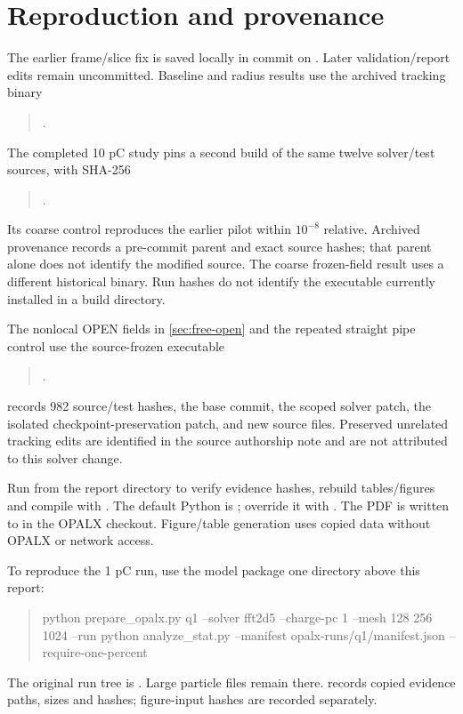 \clearpage
\section{Reproduction and provenance}
The earlier frame/slice fix is saved locally in commit  on
.
Later validation/report edits remain uncommitted. Baseline and radius results
use the archived tracking binary
\begin{quote}\small
{}.
\end{quote}
The completed 10 pC study pins a second build of the same twelve solver/test
sources, with SHA-256
\begin{quote}\small
{}.
\end{quote}
Its coarse control reproduces the earlier pilot within $10^{-8}$ relative.
Archived provenance records a pre-commit parent and exact source hashes; that
parent alone does not identify the modified source. The coarse frozen-field
result uses a different historical binary. Run hashes do not identify the
executable currently installed in a build directory.

The nonlocal OPEN fields in \cref{sec:free-open} and the repeated straight
pipe control use the source-frozen executable
\begin{quote}\small
{}.
\end{quote}
 records 982 source/test hashes, the base
commit, the scoped solver patch, the isolated checkpoint-preservation patch,
and new source files. Preserved unrelated tracking edits are identified in
the source authorship note and are not attributed to this solver change.

Run  from the report directory to verify evidence hashes,
rebuild tables/figures and compile with . The default Python is
; override it with
. The PDF is written to
 in the OPALX checkout.
Figure/table generation uses copied data without OPALX or network access.

To reproduce the 1 pC run, use the model package one directory above this report:
\begin{quote}\small\ttfamily\raggedright
python prepare\_opalx.py q1 --solver fft2d5 --charge-pc 1\newline
\hspace*{1em}--mesh 128 256 1024 --run\newline
python analyze\_stat.py --manifest opalx-runs/q1/manifest.json\newline
\hspace*{1em}--require-one-percent
\end{quote}
The original run tree is
.
Large particle files remain there.  records copied
evidence paths, sizes and hashes; figure-input hashes are recorded separately.

